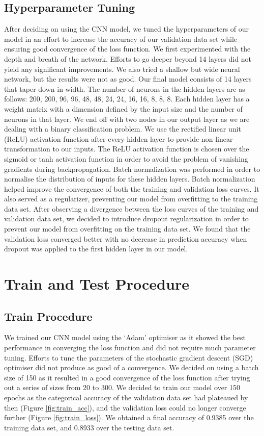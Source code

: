 \documentclass[11pt]{article}
\begin{document}
\subsection{Hyperparameter Tuning}
After deciding on using the CNN model, we tuned the hyperparameters of our model in an effort to increase the accuracy of our validation data set while ensuring good convergence of the loss function. We first experimented with the depth and breath of the network. Efforts to go deeper beyond 14 layers did not yield any significant improvements. We also tried a shallow but wide neural network, but the results were not as good. Our final model consists of 14 layers that taper down in width. The number of neurons in the hidden layers are as follows: {200, 200, 96, 96, 48, 48, 24, 24, 16, 16, 8, 8, 8}. Each hidden layer has a weight matrix with a dimension defined by the input size and the number of neurons in that layer. We end off with two nodes in our output layer as we are dealing with a binary classification problem. We use the rectified linear unit (ReLU) activation function after every hidden layer to provide non-linear transformation to our inputs. The ReLU activation function is chosen over the sigmoid or tanh activation function in order to avoid the problem of vanishing gradients during backpropagation. Batch normalization \cite{ioffe2015batch} was performed in order to normalise the distribution of inputs for these hidden layers. Batch normalization helped improve the convergence of both the training and validation loss curves. It also served as a regularizer, preventing our model from overfitting to the training data set. After observing a divergence between the loss curves of the training and validation data set, we decided to introduce dropout regularization in order to prevent our model from overfitting on the training data set. We found that the validation loss converged better with no decrease in prediction accuracy when dropout was applied to the first hidden layer in our model.

\section{Train and Test Procedure}
\subsection{Train Procedure}
We trained our CNN model using the ‘Adam’ optimiser \cite{kingma2014adam} as it showed the best performance in converging the loss function and did not require much parameter tuning. Efforts to tune the parameters of the stochastic gradient descent (SGD) optimiser did not produce as good of a convergence. We decided on using a batch size of 150 as it resulted in a good convergence of the loss function after trying out a series of sizes from 20 to 300. We decided to train our model over 150 epochs as the categorical accuracy of the validation data set had plateaued by then (Figure \ref{fig:train_acc}), and the validation loss could no longer converge further (Figure \ref{fig:train_loss}). We obtained a final accuracy of 0.9385 over the training data set, and 0.8933 over the testing data set.
\end{document}
